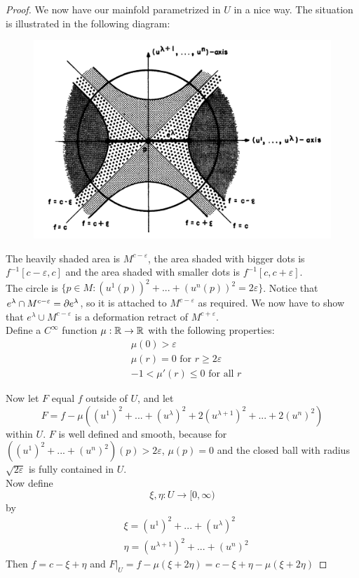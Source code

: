 \begin{proof}
   We now have our mainfold parametrized in $U$ in a nice way. The situation is
   illustrated in the following diagram:

   \begin{figure}[H]
      \centering
      \includegraphics[width=0.7\linewidth]{resources/Mil-Diagram5.png}
      \label{fig:mil-diagram5}
   \end{figure}

   The heavily shaded area is $M^{c-\varepsilon}$, the area shaded with bigger
   dots is $f^{-1}[c - \varepsilon, c]$ and the area shaded with smaller dots
   is $f^{-1}[c, c + \varepsilon]$. \\
   The circle is $\{ p \in M : (u^1(p))^2 + ... + (u^n(p))^2 = 2\varepsilon \}$.
   Notice that $e^\lambda \cap M^{c - \varepsilon} = {\partial} e^{\lambda}$, so
   it is attached to $M^{c - \varepsilon}$ as required. We now have to show that
   $e^{\lambda} \cup M^{c - \varepsilon}$ is a deformation retract of 
   $M^{c + \varepsilon}$. \\
   Define a $C^{\infty}$ function $\mu : {\mathbb R} \rightarrow {\mathbb R}$ with the following
   properties:
   \begin{align*}
      & \mu(0) > \varepsilon \\
      & \mu(r) = 0 \text{ for } r \geq 2\varepsilon \\
      & -1 < \mu'(r) \leq 0 \text{ for all } r
   \end{align*}

   Now let $F$ equal $f$ outside of $U$, and let 
   \[ F = f - \mu((u^1)^2 + ... + (u^{\lambda})^2 + 2(u^{\lambda + 1})^2 + ... + 2(u^n)^2) \]
   within $U$. $F$ is well defined and smooth, because for 
   $ ((u^1)^2 + ... + (u^n)^2)(p) > 2\varepsilon $, $\mu(p) = 0$ and the closed
   ball with radius $\sqrt{2\varepsilon}$ is fully contained in $U$. \\
   Now define 
   \[ \xi, \eta: U \rightarrow [0, \infty) \]
   by
   \begin{align*}
      & \xi = (u^1)^2 + ... + (u^{\lambda})^2 \\
      & \eta = (u^{\lambda + 1})^2 + ... + (u^n)^2
   \end{align*}
   Then $f = c - \xi + \eta$ and $F|_U = f - \mu(\xi + 2\eta) = c - \xi + \eta - \mu(\xi + 2\eta)$


\end{proof}
